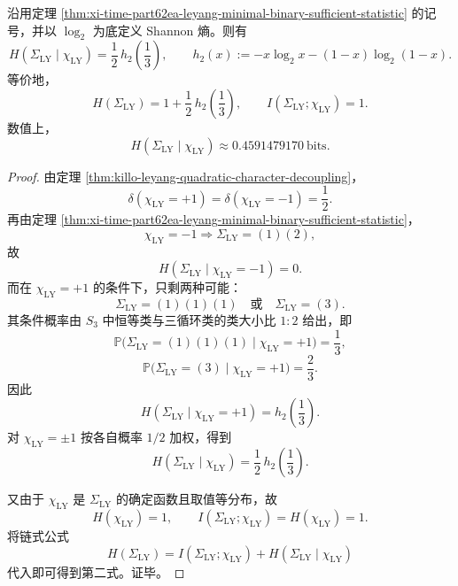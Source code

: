 \begin{corollary}[单一符号位压缩的精确信息亏损]\label{cor:xi-time-part62ea-chi-ly-exact-information-loss}
沿用定理 \ref{thm:xi-time-part62ea-leyang-minimal-binary-sufficient-statistic} 的记号，并以 \(\log_2\) 为底定义 Shannon 熵。则有
\[
H(\Sigma_{\mathrm{LY}}\mid \chi_{\mathrm{LY}})
=
\frac12\,h_2\!\left(\frac13\right),
\qquad
h_2(x):=-x\log_2 x-(1-x)\log_2(1-x).
\]
等价地，
\[
H(\Sigma_{\mathrm{LY}})
=
1+\frac12\,h_2\!\left(\frac13\right),
\qquad
I(\Sigma_{\mathrm{LY}};\chi_{\mathrm{LY}})=1.
\]
数值上，
\[
H(\Sigma_{\mathrm{LY}}\mid \chi_{\mathrm{LY}})
\approx 0.4591479170\ \text{bits}.
\]
\end{corollary}
\begin{proof}
由定理 \ref{thm:killo-leyang-quadratic-character-decoupling}，
\[
\delta(\chi_{\mathrm{LY}}=+1)=\delta(\chi_{\mathrm{LY}}=-1)=\frac12.
\]
再由定理 \ref{thm:xi-time-part62ea-leyang-minimal-binary-sufficient-statistic}，
\[
\chi_{\mathrm{LY}}=-1
\Longrightarrow
\Sigma_{\mathrm{LY}}=(1)(2),
\]
故
\[
H(\Sigma_{\mathrm{LY}}\mid \chi_{\mathrm{LY}}=-1)=0.
\]
而在 \(\chi_{\mathrm{LY}}=+1\) 的条件下，只剩两种可能：
\[
\Sigma_{\mathrm{LY}}=(1)(1)(1)\quad\text{或}\quad \Sigma_{\mathrm{LY}}=(3).
\]
其条件概率由 \(S_3\) 中恒等类与三循环类的类大小比 \(1:2\) 给出，即
\[
\mathbb P\!\bigl(\Sigma_{\mathrm{LY}}=(1)(1)(1)\mid \chi_{\mathrm{LY}}=+1\bigr)=\frac13,
\]
\[
\mathbb P\!\bigl(\Sigma_{\mathrm{LY}}=(3)\mid \chi_{\mathrm{LY}}=+1\bigr)=\frac23.
\]
因此
\[
H(\Sigma_{\mathrm{LY}}\mid \chi_{\mathrm{LY}}=+1)=h_2\!\left(\frac13\right).
\]
对 \(\chi_{\mathrm{LY}}=\pm1\) 按各自概率 \(1/2\) 加权，得到
\[
H(\Sigma_{\mathrm{LY}}\mid \chi_{\mathrm{LY}})
=
\frac12\,h_2\!\left(\frac13\right).
\]

又由于 \(\chi_{\mathrm{LY}}\) 是 \(\Sigma_{\mathrm{LY}}\) 的确定函数且取值等分布，故
\[
H(\chi_{\mathrm{LY}})=1,
\qquad
I(\Sigma_{\mathrm{LY}};\chi_{\mathrm{LY}})=H(\chi_{\mathrm{LY}})=1.
\]
将链式公式
\[
H(\Sigma_{\mathrm{LY}})
=
I(\Sigma_{\mathrm{LY}};\chi_{\mathrm{LY}})
+H(\Sigma_{\mathrm{LY}}\mid \chi_{\mathrm{LY}})
\]
代入即可得到第二式。证毕。
\end{proof}

